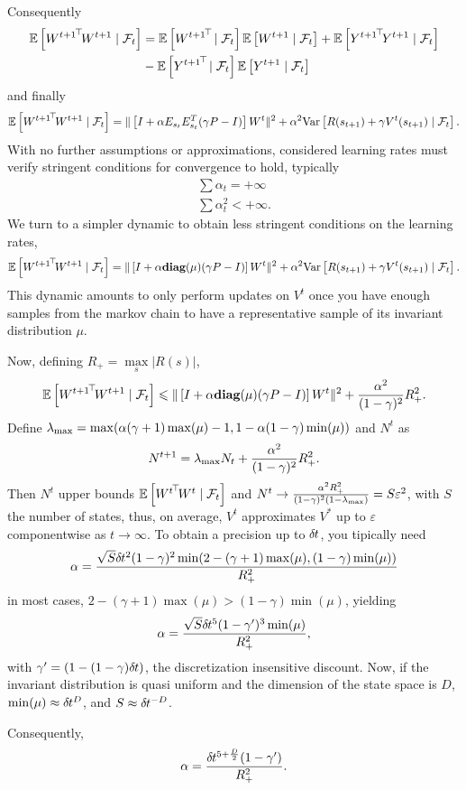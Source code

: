 Consequently
\begin{align*}
	\Ep{\transp{{W^{t+1}}} W^{t+1}} &=
	\Ep{\transp{{W^{t+1}}}}\Ep{W^{t+1}} + \Ep{\transp{{Y^{t+1}}} Y^{t+1}}\\
			       &- \Ep{\transp{{Y^{t+1}}}}\Ep{Y^{t+1}}
\end{align*}
and finally
\begin{align*}
	\mathbb{E}\left[{W^{t+1}}^{\!\top}\! W^{t+1}\mid\mathcal{F}_t\right] = \|\left[I + \alpha E_{s_t} E_{s_t}^T(\gamma P - I)\right]W^t\|^2 + \alpha ^ 2 \mathrm{Var}\left[R(s_{t+1}) + \gamma V^t(s_{t+1})\mid \mathcal{F}_t\right].
\end{align*}
With no further assumptions or approximations, considered learning rates must verify 
stringent conditions for convergence to hold, typically
\begin{align*}
	\sum\limits \alpha_t = +\infty\\
	\sum\limits \alpha_t ^ 2 < + \infty.
\end{align*}
We turn to a simpler dynamic to obtain less stringent conditions on the learning rates,
\begin{align*}
	\mathbb{E}\left[{W^{t+1}}^{\!\top}\! W^{t+1}\mid\mathcal{F}_t\right] = \|\left[I + \alpha \mathrm{\textbf{diag}}(\mu)(\gamma P - I)\right]W^t\|^2 + \alpha ^ 2 \mathrm{Var}\left[R(s_{t+1}) + \gamma V^t(s_{t+1})\mid \mathcal{F}_t\right].
\end{align*}
This dynamic amounts to only perform updates on $V^t$ once you have enough
samples from the markov chain to have a representative sample of its invariant
distribution $\mu$.

Now, defining $R_+ = \max\limits_s |R(s)|$,
\begin{align}
	\mathbb{E}\left[{W^{t+1}}^{\!\top}\! W^{t+1}\mid\mathcal{F}_t\right] \leqslant \|\left[I + \alpha \mathrm{\textbf{diag}}(\mu)(\gamma P - I)\right]W^t\|^2 + \frac{\alpha^2}{(1 - \gamma)^2} R_+^2.
\end{align}
Define $\lambda_{\mathrm{max}} = \max(\alpha (\gamma + 1) \max(\mu) - 1, 1 - \alpha (1 - \gamma) \min(\mu))$ and $N^t$ as
\begin{align}
	N^{t+1} = \lambda_{\mathrm{max}} N_t + \frac{\alpha^2}{(1 - \gamma)^2} R_+^2.
\end{align}
Then $N^t$ upper bounds $\mathbb{E}\left[{W^t}^{\!\top}\! W^t\mid\mathcal{F}_t\right]$ and $N^t \to \frac{\alpha^2 R_+^2} {(1
- \gamma)^2 (1 - \lambda_{\mathrm{max}})} = S \varepsilon^2$, with $S$ the number of states,
thus, on average, $V^t$ approximates $V^*$ up to $\varepsilon$ componentwise as
$t\to\infty$.  To obtain a precision up to $\delta\hspace{-.06em}t$, you tipically need
\begin{align}
	\alpha = \frac{\sqrt{S}\delta\hspace{-.06em}t^2(1 - \gamma)^2\min(2 - (\gamma + 1)\max(\mu),(1-\gamma)\min(\mu))}{R_+^2}
\end{align}
in most cases, $2 - (\gamma + 1)\max(\mu) > (1 - \gamma) \min(\mu)$, yielding
\begin{align}
	\alpha = \frac{\sqrt{S}\delta\hspace{-.06em}t^5 (1 - \gamma')^3 \min(\mu)}{R_+^2},
\end{align}
with $\gamma' = (1 - (1 - \gamma) \delta\hspace{-.06em}t)$, the discretization insensitive discount.
Now, if the invariant distribution is quasi uniform and the dimension of the state space
is $D$, $\min(\mu) \approx \delta\hspace{-.06em}t^D$, and $S \approx \delta\hspace{-.06em}t^{-D}$.

Consequently,
\begin{equation}
	\alpha = \frac{\delta\hspace{-.06em}t^{5 + \frac{D}{2}}(1 - \gamma')}{R_+^2}.
\end{equation}
